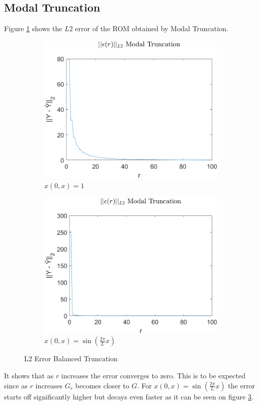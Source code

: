 \subsection{Modal Truncation}
Figure \ref{FIG-ERR-MT} shows the \(L2\) error of the ROM obtained by Modal Truncation.
\begin{figure}[H]
\begin{subfigure}[b]{0.5\textwidth}
\centering
\includegraphics[width=\textwidth]{images/L2_MT}
\caption{$x(0, x) = 1$}
\label{FIG-ERR-MT}
\end{subfigure}
\begin{subfigure}[b]{0.5\textwidth}
\centering
\includegraphics[width=\textwidth]{images/L2_MT_SIN}
\caption{$x(0, x) = \sin(\frac{2\pi}{L}x)$}
\label{FIG-ERR-MT-SIN}
\end{subfigure}
\caption{L2 Error Balanced Truncation}
\end{figure}
It shows that as \(r\) increases the error converges to zero.
This is to be expected since as \(r\) increases \(G_r\) becomes closer to \(G\).
For \(x(0, x) = \sin(\frac{2\pi}{L}x)\) the error starts off significantly higher but decays even faster as it can be seen on figure \ref{FIG-ERR-MT-SIN}.

